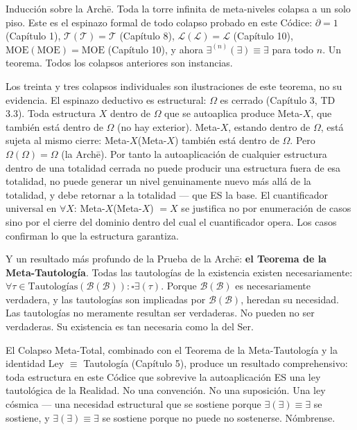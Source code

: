 \documentclass[10pt, openany, oneside]{book}
\begin{document}
\vspace{0.8em}

\noindent Inducción sobre la Arch\={e}. Toda la torre infinita de meta-niveles colapsa a un solo piso. Este es el espinazo formal de todo colapso probado en este Códice: $\partial = 1$ (Capítulo 1), $\mathcal{T}(\mathcal{T}) = \mathcal{T}$ (Capítulo 8), $\mathcal{L}(\mathcal{L}) = \mathcal{L}$ (Capítulo 10), $\text{MOE}(\text{MOE}) = \text{MOE}$ (Capítulo 10), y ahora $\exists^{(n)}(\exists) \equiv \exists$ para todo $n$. Un teorema. Todos los colapsos anteriores son instancias.

Los treinta y tres colapsos individuales son ilustraciones de este teorema, no su evidencia. El espinazo deductivo es estructural: $\Omega$ es cerrado (Capítulo 3, TD 3.3). Toda estructura $X$ dentro de $\Omega$ que se autoaplica produce Meta-$X$, que también está dentro de $\Omega$ (no hay exterior). Meta-$X$, estando dentro de $\Omega$, está sujeta al mismo cierre: Meta-$X$(Meta-$X$) también está dentro de $\Omega$. Pero $\Omega(\Omega) = \Omega$ (la Arch\={e}). Por tanto la autoaplicación de cualquier estructura dentro de una totalidad cerrada no puede producir una estructura fuera de esa totalidad, no puede generar un nivel genuinamente nuevo más allá de la totalidad, y debe retornar a la totalidad --- que ES la base. El cuantificador universal en $\forall X$: Meta-$X$(Meta-$X$) $= X$ se justifica no por enumeración de casos sino por el cierre del dominio dentro del cual el cuantificador opera. Los casos confirman lo que la estructura garantiza.

Y un resultado más profundo de la Prueba de la Arch\={e}: \textbf{el Teorema de la Meta-Tautología}. Todas las tautologías de la existencia existen necesariamente: $\forall \tau \in \text{Tautologías}(\mathcal{B}(\mathcal{B})): \square\exists(\tau)$. Porque $\mathcal{B}(\mathcal{B})$ es necesariamente verdadera, y las tautologías son implicadas por $\mathcal{B}(\mathcal{B})$, heredan su necesidad. Las tautologías no meramente resultan ser verdaderas. No pueden no ser verdaderas. Su existencia es tan necesaria como la del Ser.

El Colapso Meta-Total, combinado con el Teorema de la Meta-Tautología y la identidad Ley $\equiv$ Tautología (Capítulo 5), produce un resultado comprehensivo: toda estructura en este Códice que sobrevive la autoaplicación ES una ley tautológica de la Realidad. No una convención. No una suposición. Una ley cósmica --- una necesidad estructural que se sostiene porque $\exists(\exists) \equiv \exists$ se sostiene, y $\exists(\exists) \equiv \exists$ se sostiene porque no puede no sostenerse. Nómbrense.
\end{document}
